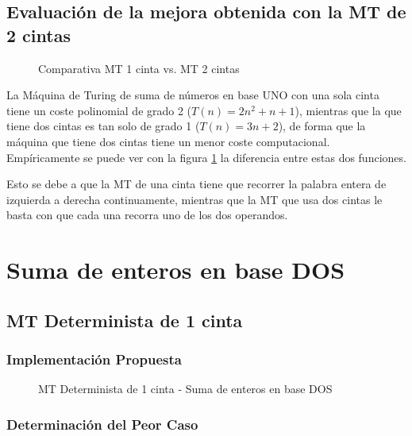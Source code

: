 \documentclass{uc3mpracticas}
\begin{document}
  \subsection{Evaluación de la mejora obtenida con la MT de 2 cintas}


  \begin{figure}[!h]
    \caption{Comparativa MT 1 cinta vs. MT 2 cintas}
    \label{fig:comparativa1}
  \end{figure}

  La Máquina de Turing de suma de números en base UNO con una sola cinta tiene un coste polinomial de grado 2 ($T(n) = 2n^2 + n + 1$), mientras que la que tiene dos cintas es tan solo de grado 1 ($T(n) = 3n + 2$), de forma que la máquina que tiene dos cintas tiene un menor coste computacional. Empíricamente se puede ver con la figura \ref{fig:comparativa1} la diferencia entre estas dos funciones.


  \vspace{4mm}

  Esto se debe a que la MT de una cinta tiene que recorrer la palabra entera de izquierda a derecha continuamente, mientras que la MT que usa dos cintas le basta con que cada una recorra uno de los dos operandos.



  \clearpage


  \section{Suma de enteros en base DOS}



  \subsection{MT Determinista de 1 cinta}

  \subsubsection{Implementación Propuesta}

  \begin{figure}[!h]
    \caption{MT Determinista de 1 cinta - Suma de enteros en base DOS}
  \end{figure}


  \subsubsection{Determinación del Peor Caso}
\end{document}

